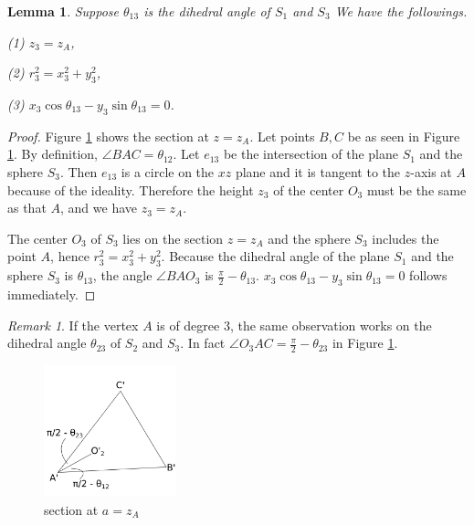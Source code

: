 \documentclass[suppldata, dvipdfmx]{interact}
\theoremstyle{plain}%
\newtheorem{lemma}[theorem]{Lemma}
\theoremstyle{definition}
\theoremstyle{remark}
\newtheorem{remark}{Remark}
\theoremstyle{problemstyle}
\begin{document}
\begin{lemma}
Suppose $\theta_{13}$ is the dihedral angle of $S_1$ and $S_3$   We have the followings.\par
(1) $z_3=z_A$,\par
(2) $r_3^2 = x_3^2+y_3^2$, \par
(3) $x_3\cos\theta_{13} - y_3\sin\theta_{13}=0$.\par
\end{lemma}

\begin{proof}
Figure \ref{fig:sectionAtVertex} shows the section at $z=z_A$.  Let points $B, C$ be as seen in Figure \ref{fig:sectionAtVertex}.  By definition, $\angle BAC=\theta_{12}$.  Let $e_{13}$ be the intersection of the plane $S_1$ and the sphere $S_3$.  Then $e_{13}$ is a circle on the $xz$ plane and it is tangent to the $z$-axis at $A$ because of the ideality.  Therefore the height $z_3$ of the center $O_3$ must be the same as that $A$, and we have $z_3 = z_A$.\par
The center $O_3$ of $S_3$ lies on the section $z=z_A$ and the sphere $S_3$ includes the point $A$, hence $r_3^2 = x_3^2+y_3^2$.  
Because the dihedral angle of the plane $S_1$ and the sphere $S_3$ is $\theta_{13}$,  the angle $\angle BAO_3$ is $\frac{\pi}{2}-\theta_{13}$.  $x_3\cos\theta_{13} - y_3\sin\theta_{13}=0$ follows immediately. 
\end{proof}

\begin{remark}
If the vertex $A$ is of degree $3$, the same observation works on the dihedral angle $\theta_{23}$ of $S_2$ and $S_3$.  In fact $\angle O_3AC=\frac{\pi}{2}-\theta_{23}$ in Figure \ref{fig:sectionAtVertex}. 
\end{remark}

\begin{figure}[h!tbp]
\begin{center}
   \includegraphics[width=1.5in, height=1.5in,
  keepaspectratio]{./img/HexahedraWithSphericalFaces/abcTriangle.png}
  \caption{section at $a=z_A$}
  \label{fig:sectionAtVertex}
\end{center}
\end{figure}
\end{document}
